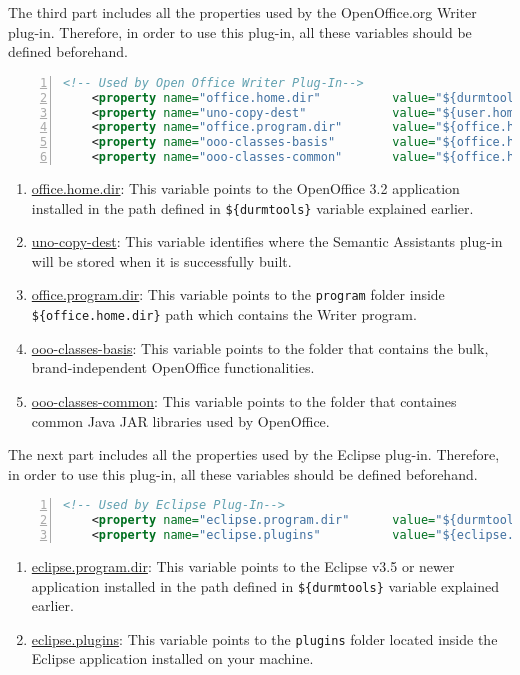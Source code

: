 The third part includes all the properties used by the OpenOffice.org Writer plug-in. Therefore, in order to use this plug-in, all these variables should be defined beforehand.
\begin{lstlisting}[language=XML,numbers=left,xleftmargin=8mm,columns=flexible]
    <!-- Used by Open Office Writer Plug-In-->    
    <property name="office.home.dir"          value="${durmtools}/OpenOffice"/>
    <property name="uno-copy-dest"  	      value="${user.home}/Documents/uno-components" />
    <property name="office.program.dir"       value="${office.home.dir}/program"/>
    <property name="ooo-classes-basis"        value="${office.home.dir}/basis3.2/program/classes/" />
    <property name="ooo-classes-common"       value="${office.home.dir}/ure/share/java/" />
\end{lstlisting}
\begin{enumerate}
\item \url{office.home.dir}: This variable points to the OpenOffice 3.2 application installed in the path defined in \texttt{\$\{durmtools\}} variable explained earlier.
\item \url{uno-copy-dest}: This variable identifies where the Semantic Assistants plug-in will be stored when it is successfully built. 
\item \url{office.program.dir}: This variable points to the \texttt{program} folder inside \texttt{\$\{office.home.dir\}} path which contains the Writer program.
\item \url{ooo-classes-basis}: This variable points to the folder that contains the bulk, brand-independent OpenOffice functionalities.
\item \url{ooo-classes-common}: This variable points to the folder that containes common Java JAR libraries used by OpenOffice.
\end{enumerate}

The next part includes all the properties used by the Eclipse plug-in. Therefore, in order to use this plug-in, all these variables should be defined beforehand.
\begin{lstlisting}[language=XML,numbers=left,xleftmargin=8mm,columns=flexible]
    <!-- Used by Eclipse Plug-In-->
    <property name="eclipse.program.dir"      value="${durmtools}/eclipse-4.0"/>
    <property name="eclipse.plugins"          value="${eclipse.program.dir}/plugins"/>
\end{lstlisting}
\begin{enumerate}
\item \url{eclipse.program.dir}: This variable points to the Eclipse v3.5 or newer application installed in the path defined in \texttt{\$\{durmtools\}} variable explained earlier.
\item \url{eclipse.plugins}: This variable points to the \texttt{plugins} folder located inside the Eclipse application installed on your machine.
\end{enumerate}


